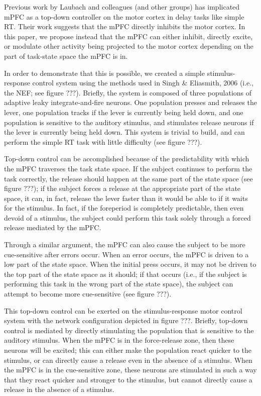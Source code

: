 \documentclass[12pt]{article}
\begin{document}
Previous work by Laubach and colleagues (and other groups)
has implicated mPFC as a top-down controller
on the motor cortex in delay tasks like simple RT.
Their work suggests that the mPFC directly inhibits
the motor cortex.
In this paper, we propose instead that the mPFC
can either inhibit, directly excite,
or modulate other activity being projected
to the motor cortex depending on
the part of task-state space the mPFC is in.

In order to demonstrate that this is possible,
we created a simple stimulus-response control system
using the methods used in Singh \& Eliasmith, 2006
(i.e., the NEF; see figure ???).
Briefly, the system is composed of three populations
of adaptive leaky integrate-and-fire neurons.
One population presses and releases the lever,
one population tracks if the lever is currently being held down,
and one population is sensitive to the auditory stimulus,
and stimulates release neurons if the lever
is currently being held down.
This system is trivial to build,
and can perform the simple RT task
with little difficulty (see figure ???).

Top-down control can be accomplished
because of the predictability with which
the mPFC traverses the task state space.
If the subject continues to perform the task correctly,
the release should happen at the same part
of the state space (see figure ???);
if the subject forces a release at the appropriate
part of the state space, it can, in fact,
release the lever faster than it would be able to
if it waits for the stimulus.
In fact, if the foreperiod is completely
predictable, then even devoid of a stimulus,
the subject could perform this task
solely through a forced release mediated
by the mPFC.

Through a similar argument, the mPFC
can also cause the subject to be more
cue-sensitive after errors occur.
When an error occurs, the mPFC is driven to a
low part of the state space.
When the initial press occurs, it may not
be driven to the top part of the state space
as it should; if that occurs (i.e.,
if the subject is performing this task
in the wrong part of the state space),
the subject can attempt to become more cue-sensitive
(see figure ???).

This top-down control can be exerted
on the stimulus-response motor control system
with the network configuration depicted in
figure ???. Briefly, top-down control
is mediated by directly stimulating
the population that is sensitive to the auditory stimulus.
When the mPFC is in the force-release zone,
then these neurons will be excited;
this can either make the population react quicker to
the stimulus, or can directly cause a release
even in the absence of a stimulus.
When the mPFC is in the cue-sensitive zone,
these neurons are stimulated in such a way that
they react quicker and stronger to the stimulus,
but cannot directly cause a release
in the absence of a stimulus.
\end{document}
